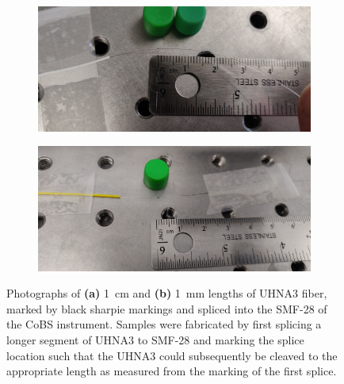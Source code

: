 \begin{figure}[t]
    \centering
    \begin{subfigure}[b]{0.49\textwidth}
        \centering
        \includegraphics[width=\textwidth]{figs/4-Raman/1cm UHNA3.jpeg}
        \caption{}
        \label{fig:Raman:1cmUHNA3pic}
    \end{subfigure}
    \hfill
    \begin{subfigure}[b]{0.49\textwidth}
        \centering
        \includegraphics[width=\textwidth]{figs/4-Raman/1mm UHNA3 in apparatus.jpeg}
        \caption{}
        \label{fig:Raman:1mmUHNA3pic}
    \end{subfigure}
    \caption[Photographs of \SI{1}{\centi\meter} and \SI{1}{\milli\meter} lengths of \ac{UHNA3} fiber.]{Photographs of \textbf{(a)} \SI{1}{\centi\meter} and \textbf{(b)} \SI{1}{\milli\meter} lengths of \ac{UHNA3} fiber, marked by black sharpie markings and spliced into the \ac{SMF-28} of the \ac{CoBS} instrument. Samples were fabricated by first splicing a longer segment of \ac{UHNA3} to \ac{SMF-28} and marking the splice location such that the \ac{UHNA3} could subsequently be cleaved to the appropriate length as measured from the marking of the first splice.}
    \label{fig:Raman:UHNA3}
\end{figure}

